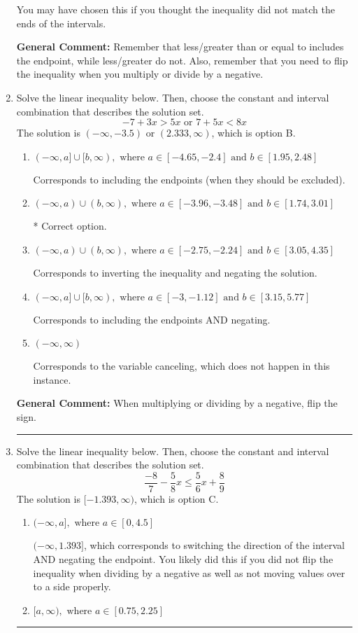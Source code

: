 \documentclass{extbook}[14pt]
\newcommand{\litem}[1]{\item #1

\rule{\textwidth}{0.4pt}}
\begin{document}
\begin{enumerate}
{\begin{enumerate}[label=\Alph*.]
You may have chosen this if you thought the inequality did not match the ends of the intervals.
\end{enumerate}

\textbf{General Comment:} Remember that less/greater than or equal to includes the endpoint, while less/greater do not. Also, remember that you need to flip the inequality when you multiply or divide by a negative.
}
\litem{
Solve the linear inequality below. Then, choose the constant and interval combination that describes the solution set.
\[ -7 + 3 x > 5 x \text{ or } 7 + 5 x < 8 x \]The solution is \( (-\infty, -3.5) \text{ or } (2.333, \infty) \), which is option B.\begin{enumerate}[label=\Alph*.]
\item \( (-\infty, a] \cup [b, \infty), \text{ where } a \in [-4.65, -2.4] \text{ and } b \in [1.95, 2.48] \)

Corresponds to including the endpoints (when they should be excluded).
\item \( (-\infty, a) \cup (b, \infty), \text{ where } a \in [-3.96, -3.48] \text{ and } b \in [1.74, 3.01] \)

 * Correct option.
\item \( (-\infty, a) \cup (b, \infty), \text{ where } a \in [-2.75, -2.24] \text{ and } b \in [3.05, 4.35] \)

Corresponds to inverting the inequality and negating the solution.
\item \( (-\infty, a] \cup [b, \infty), \text{ where } a \in [-3, -1.12] \text{ and } b \in [3.15, 5.77] \)

Corresponds to including the endpoints AND negating.
\item \( (-\infty, \infty) \)

Corresponds to the variable canceling, which does not happen in this instance.
\end{enumerate}

\textbf{General Comment:} When multiplying or dividing by a negative, flip the sign.
}
\litem{
Solve the linear inequality below. Then, choose the constant and interval combination that describes the solution set.
\[ \frac{-8}{7} - \frac{5}{8} x \leq \frac{5}{6} x + \frac{8}{9} \]The solution is \( [-1.393, \infty) \), which is option C.\begin{enumerate}[label=\Alph*.]
\item \( (-\infty, a], \text{ where } a \in [0, 4.5] \)

 $(-\infty, 1.393]$, which corresponds to switching the direction of the interval AND negating the endpoint. You likely did this if you did not flip the inequality when dividing by a negative as well as not moving values over to a side properly.
\item \( [a, \infty), \text{ where } a \in [0.75, 2.25] \)


\end{enumerate}}
\end{enumerate}
\end{document}
